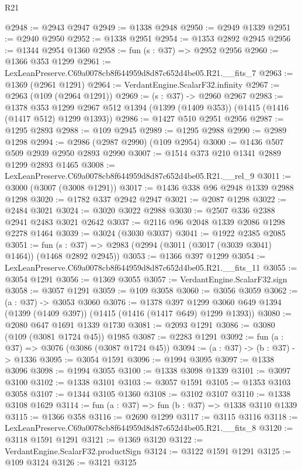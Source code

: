 \begin{lexlean}{R21}
\begin{coremodule}
@2948 := @2943 @2947
@2949 := @1338 @2948
@2950 := @2949 @1339
@2951 := @2940 @2950
@2952 := @1338 @2951
@2954 := @1353 @2892 @2945
@2956 := @1344 @2954 @1360
@2958 := fun (s : @37) => @2952 @2956
@2960 := @1366 @353 @1299
@2961 := LexLeanPreserve.C69a0078cb8f644959d8d87c652d4be05.R21.__fits_7
@2963 := @1369 (@2961 @1291)
@2964 := VerdantEngine.ScalarF32.infinity
@2967 := @2963 (@109 (@2964 @1291))
@2969 := (s : @37) -> @2960 @2967
@2983 := @1378
    @353
    @1299
    @2967
    @512
    @1394
    (@1399 (@1409 @353))
    (@1415 (@1416 (@1417 @512) @1299 @1393))
@2986 := @1427 @510 @2951 @2956
@2987 := @1295 @2893
@2988 := @109 @2945
@2989 := @1295 @2988
@2990 := @2989 @1298
@2994 := @2986 (@2987 @2990) (@109 @2954)
@3000 := @1436 @507 @509 @2939 @2950 @2893 @2990
@3007 := @1514 @373 @210 @1341 @2889 @1299 @2893 @1465
@3008 := LexLeanPreserve.C69a0078cb8f644959d8d87c652d4be05.R21.__rel_9
@3011 := @3000 (@3007 (@3008 @1291))
@3017 := @1436 @338 @96 @2948 @1339 @2988 @1298
@3020 := @1782 @337 @2942 @2947
@3021 := @2087 @1298
@3022 := @2484 @3021
@3024 := @3020 @3022 @2988
@3030 := @2507 @336 @2388 @2941 @2483 @3021 @2642
@3037 := @2116 @96 @2048 @1339 @2086 @1298 @2278 @1464
@3039 := @3024 (@3030 @3037)
@3041 := @1922 @2385 @2085
@3051 := fun (s : @37) => @2983 (@2994 (@3011 (@3017 (@3039 @3041) @1464)) (@1468 @2892 @2945))
@3053 := @1366 @397 @1299
@3054 := LexLeanPreserve.C69a0078cb8f644959d8d87c652d4be05.R21.__fits_11
@3055 := @3054 @1291
@3056 := @1369 @3055
@3057 := VerdantEngine.ScalarF32.sign
@3058 := @3057 @1291
@3059 := @109 @3058
@3060 := @3056 @3059
@3062 := (a : @37) -> @3053 @3060
@3076 := @1378
    @397
    @1299
    @3060
    @649
    @1394
    (@1399 (@1409 @397))
    (@1415 (@1416 (@1417 @649) @1299 @1393))
@3080 := @2080 @647 @1691 @1339 @1730
@3081 := @2093 @1291
@3086 := @3080 (@109 (@3081 @1724 @45)) @1985
@3087 := @2283 @1291
@3092 := fun (a : @37) => @3076 (@3086 (@3087 @1724 @45))
@3094 := (a : @37) -> (b : @37) -> @1336
@3095 := @3054 @1591
@3096 := @1994 @3095
@3097 := @1338 @3096
@3098 := @1994 @3055
@3100 := @1338 @3098 @1339
@3101 := @3097 @3100
@3102 := @1338 @3101
@3103 := @3057 @1591
@3105 := @1353 @3103 @3058
@3107 := @1344 @3105 @1360
@3108 := @3102 @3107
@3110 := @1338 @3108 @1629
@3114 := fun (a : @37) => fun (b : @37) => @1338 @3110 @1339
@3115 := @1366 @358
@3116 := @2690 @1299
@3117 := @3115 @3116
@3118 := LexLeanPreserve.C69a0078cb8f644959d8d87c652d4be05.R21.__fits_8
@3120 := @3118 @1591 @1291
@3121 := @1369 @3120
@3122 := VerdantEngine.ScalarF32.productSign
@3124 := @3122 @1591 @1291
@3125 := @109 @3124
@3126 := @3121 @3125

\end{coremodule}
\end{lexlean}
